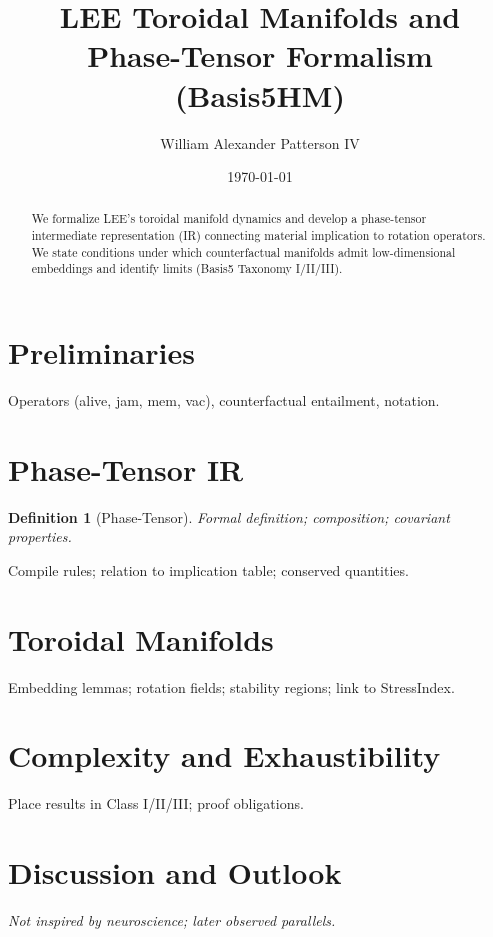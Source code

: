 \documentclass[11pt]{article}
\title{LEE Toroidal Manifolds and Phase-Tensor Formalism (Basis5HM)}
\author{William Alexander Patterson IV}
\date{\today}
\newtheorem{definition}{Definition}
\begin{document}
	\maketitle
	
	\begin{abstract}
		We formalize LEE’s toroidal manifold dynamics and develop a phase-tensor intermediate representation (IR) connecting material implication to rotation operators. We state conditions under which counterfactual manifolds admit low-dimensional embeddings and identify limits (Basis5 Taxonomy I/II/III).
	\end{abstract}
	
	\section{Preliminaries}
	Operators (alive, jam, mem, vac), counterfactual entailment, notation.
	
	\section{Phase-Tensor IR}
	\begin{definition}[Phase-Tensor]
		Formal definition; composition; covariant properties.
	\end{definition}
	Compile rules; relation to implication table; conserved quantities.
	
	\section{Toroidal Manifolds}
	Embedding lemmas; rotation fields; stability regions; link to StressIndex.
	
	\section{Complexity and Exhaustibility}
	Place results in Class I/II/III; proof obligations.
	
	\section{Discussion and Outlook}
	\textit{Not inspired by neuroscience; later observed parallels.}
	
	
	
\end{document}
